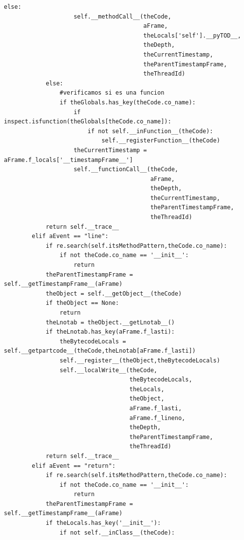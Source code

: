 \documentclass[12pt,legalpaper]{report}
\begin{document}
\begin{singlespace}
\begin{lstlisting}[style=Python]
                else:
                    self.__methodCall__(theCode,
                                        aFrame,
                                        theLocals['self'].__pyTOD__,
                                        theDepth,
                                        theCurrentTimestamp,
                                        theParentTimestampFrame,
                                        theThreadId)
            else:
                #verificamos si es una funcion
                if theGlobals.has_key(theCode.co_name):
                    if inspect.isfunction(theGlobals[theCode.co_name]):
                        if not self.__inFunction__(theCode):
                            self.__registerFunction__(theCode)
                    theCurrentTimestamp = aFrame.f_locals['__timestampFrame__']
                    self.__functionCall__(theCode,
                                          aFrame,
                                          theDepth,
                                          theCurrentTimestamp,
                                          theParentTimestampFrame,
                                          theThreadId)   
            return self.__trace__
        elif aEvent == "line":
            if re.search(self.itsMethodPattern,theCode.co_name):
                if not theCode.co_name == '__init__':
                    return
            theParentTimestampFrame = self.__getTimestampFrame__(aFrame)
            theObject = self.__getObject__(theCode)
            if theObject == None:
                return
            theLnotab = theObject.__getLnotab__()
            if theLnotab.has_key(aFrame.f_lasti):
                theBytecodeLocals = self.__getpartcode__(theCode,theLnotab[aFrame.f_lasti])
                self.__register__(theObject,theBytecodeLocals)
                self.__localWrite__(theCode,
                                    theBytecodeLocals,
                                    theLocals,
                                    theObject,
                                    aFrame.f_lasti,
                                    aFrame.f_lineno,
                                    theDepth,
                                    theParentTimestampFrame,
                                    theThreadId)
            return self.__trace__
        elif aEvent == "return":
            if re.search(self.itsMethodPattern,theCode.co_name):
                if not theCode.co_name == '__init__':
                    return
            theParentTimestampFrame = self.__getTimestampFrame__(aFrame)
            if theLocals.has_key('__init__'):
                if not self.__inClass__(theCode):

\end{lstlisting}
\end{singlespace}
\end{document}
